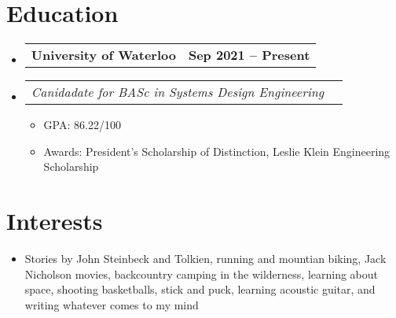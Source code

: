 \documentclass[letterpaper,11pt]{article}
\makeatletter
\newcommand{\subItem}[1]{
  \item\small{{#1 \vspace{-2pt}}}}
\newcommand{\subHeading}[2]{
  \vspace{-5pt}\item
  \begin{tabular*}{1.001\textwidth}{l@{\extracolsep{\fill}}r}
    \small#1 & \textbf{\small #2} 
    \setlength{\parskip}{6pt}
  \end{tabular*}\vspace{-7pt}}
\newcommand{\subHeadingListStart}{\begin{itemize}[leftmargin=0.0in, label={}]}
\newcommand{\subHeadingListEnd}{\end{itemize}}
\newcommand{\subItemListStart}{\begin{itemize}}
\newcommand{\subItemListEnd}{\end{itemize}\vspace{-5pt}}
\makeatother
\begin{document}
\section{\textcolor{main}{Education}}
  \subHeadingListStart

    \subHeading
      {\textbf{University of Waterloo}}
      {Sep 2021 -- Present}
      \vspace{-25pt}
    \subHeading
      {\emph{Canidadate for BASc in Systems Design Engineering}}
      {\normalfont{\emph{Waterloo, Ontario}}}
    \subItemListStart
    \subItem{GPA: 86.22/100}
    \subItem{Awards: President's Scholarship of Distinction, Leslie Klein Engineering Scholarship}
    \subItemListEnd

  \subHeadingListEnd
\vspace{-18pt}

\section{\textcolor{main}{Interests}}
  \begin{itemize}[leftmargin=0in, label={}]
    \item\small{Stories by John Steinbeck and Tolkien, running and mountian biking, Jack Nicholson movies, backcountry camping in the    
    wilderness, learning about space, shooting basketballs, stick and puck, learning acoustic guitar, and writing whatever comes to my mind}
  \end{itemize}
\vspace{-16pt}

\end{document}
